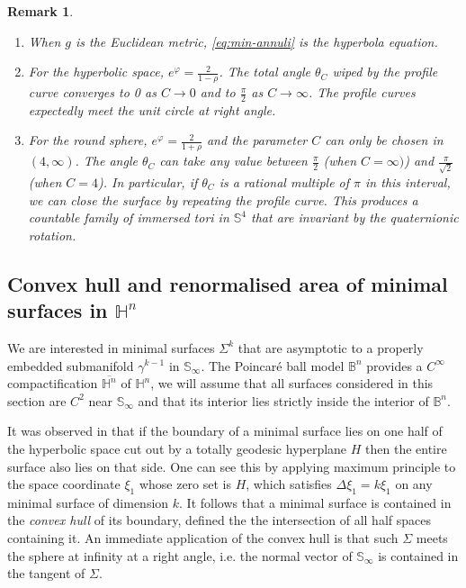 \documentclass[11pt]{article}
\newtheorem{remark}[theorem]{Remark}
\begin{document}
\begin{remark}
\label{rem:min-annuli}
\begin{enumerate}
\item When \(g\) is the Euclidean metric, \eqref{eq:min-annuli} is
the hyperbola equation.
\item For the hyperbolic space, \(e^\varphi = \frac{2}{1-\rho}\). The total angle \(\theta_C\) wiped by the profile curve converges to 0 as
\(C\to 0\) and to \(\frac{\pi}{2}\) as \(C\to\infty\). The profile curves expectedly meet
the unit circle at right angle.
\item For the round sphere, \(e^\varphi = \frac{2}{1+\rho}\) and the parameter \(C\) can only be chosen in \((4,\infty)\). The angle \(\theta_C\) can take any value between \(\frac{\pi}{2}\) (when \(C=\infty)\)) and
\(\frac{\pi}{\sqrt{2}}\) (when \(C=4\)). In particular, if \(\theta_C\) is a
rational multiple of \(\pi\) in this interval, we can close the surface by repeating
the profile curve. This produces a countable family of immersed tori in \(\mathbb{S}^4\) that are invariant by the quaternionic rotation.
\end{enumerate}
\end{remark}
\subsection{Convex hull and renormalised area of minimal surfaces in \(\mathbb{H}^n\)}
\label{sec:orgec37166}
We are interested in minimal surfaces \(\Sigma^k\)
that are asymptotic to a properly embedded submanifold \(\gamma^{k-1}\) in \(\mathbb{S}_\infty\). The Poincaré ball model \(\mathbb{B}^n\) provides a \(C^\infty\)
compactification \(\overline{\mathbb{H}^n}\) of \(\mathbb{H}^n\), we will assume that
all surfaces considered in this section are \(C^2\)
near \(\mathbb{S}_\infty\) and that its interior lies strictly inside the interior of \(\mathbb{B}^n\).

It was observed in \cite{Anderson82_CompleteMinimalVarieties} that if the boundary of a
minimal surface lies on one half of the hyperbolic space cut out by a totally geodesic
hyperplane \(H\) then the entire surface also lies on that side. One can see this by
applying maximum principle to the space coordinate \(\xi_1\) whose zero set is \(H\),
which satisfies \(\Delta \xi_1 = k \xi_1\) on any minimal surface of dimension \(k\). It follows that a
minimal surface is contained in the \emph{convex hull} of its boundary, defined the the
intersection of all half spaces containing it.
An immediate application of the convex hull is that such \(\Sigma\) meets the sphere at infinity
at a right angle, i.e. the normal vector of \(\mathbb{S}_\infty\) is
contained in the tangent of \(\Sigma\).
\end{document}
